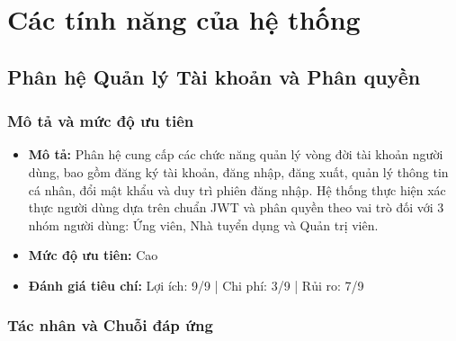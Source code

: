 
\clearpage

\section{Các tính năng của hệ thống}

\subsection{Phân hệ Quản lý Tài khoản và Phân quyền}

\subsubsection{Mô tả và mức độ ưu tiên}

\begin{itemize}
  \item \textbf{Mô tả:} Phân hệ cung cấp các chức năng quản lý vòng đời tài khoản người dùng, bao gồm đăng ký tài khoản, đăng nhập, đăng xuất, quản lý thông tin cá nhân, đổi mật khẩu và duy trì phiên đăng nhập. Hệ thống thực hiện xác thực người dùng dựa trên chuẩn JWT và phân quyền theo vai trò đối với 3 nhóm người dùng: Ứng viên, Nhà tuyển dụng và Quản trị viên.
  \item \textbf{Mức độ ưu tiên:} Cao
  \item \textbf{Đánh giá tiêu chí:} Lợi ích: 9/9 | Chi phí: 3/9 | Rủi ro: 7/9
\end{itemize}

\subsubsection{Tác nhân và Chuỗi đáp ứng}

